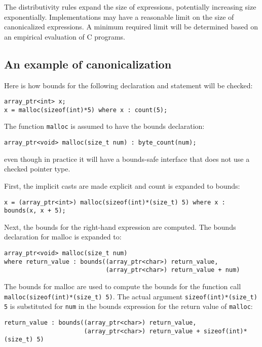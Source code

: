 The distributivity rules expand the size of expressions, potentially
increasing size exponentially. Implementations may have a reasonable
limit on the size of canonicalized expressions. A minimum required limit
will be determined based on an empirical evaluation of C programs.

\subsection{An example of canonicalization}
\label{section:canonicalization-example}

Here is how bounds for the following declaration and statement will be checked:
\begin{verbatim}
array_ptr<int> x;
x = malloc(sizeof(int)*5) where x : count(5);
\end{verbatim}

The function \verb+malloc+ is assumed to have the bounds declaration:

\begin{verbatim}
array_ptr<void> malloc(size_t num) : byte_count(num);
\end{verbatim}

even though in practice it will have a bounds-safe interface that does
not use a checked pointer type.

First, the implicit casts are made explicit and count is expanded to bounds:

\begin{verbatim}
x = (array_ptr<int>) malloc(sizeof(int)*(size_t) 5) where x : bounds(x, x + 5);
\end{verbatim}

Next, the bounds for the right-hand expression are computed. The bounds
declaration for malloc is expanded to:
\begin{verbatim}
array_ptr<void> malloc(size_t num)  
where return_value : bounds((array_ptr<char>) return_value, 
                            (array_ptr<char>) return_value + num)
\end{verbatim}

The bounds for malloc are used to compute the bounds for the function
call \verb+malloc(sizeof(int)*(size_t) 5)+. The actual argument
\verb+sizeof(int)*(size_t) 5+ is substituted for \verb+num+ in the
bounds expression for the return value of \verb+malloc+:
\begin{verbatim}
return_value : bounds((array_ptr<char>) return_value, 
                      (array_ptr<char>) return_value + sizeof(int)*(size_t) 5)
\end{verbatim}

